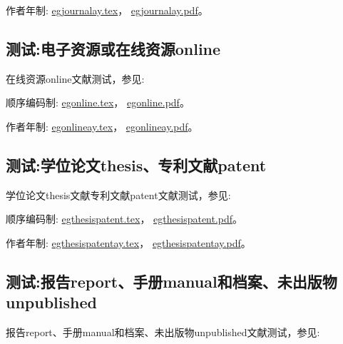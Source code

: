 作者年制:
\href{run:./example/egjournalay.tex}{egjournalay.tex}，
\href{run:./example/egjournalay.pdf}{egjournalay.pdf}。

\subsection{测试:电子资源或在线资源online}
在线资源online文献测试，参见:

顺序编码制:
\href{run:./example/egonline.tex}{egonline.tex}，
\href{run:./example/egonline.pdf}{egonline.pdf}。

作者年制:
\href{run:./example/egonlineay.tex}{egonlineay.tex}，
\href{run:./example/egonlineay.pdf}{egonlineay.pdf}。



\subsection{测试:学位论文thesis、专利文献patent}
学位论文thesis文献专利文献patent文献测试，参见:

顺序编码制:
\href{run:./example/egthesispatent.tex}{egthesispatent.tex}，
\href{run:./example/egthesispatent.pdf}{egthesispatent.pdf}。

作者年制:
\href{run:./example/egthesispatentay.tex}{egthesispatentay.tex}，
\href{run:./example/egthesispatentay.pdf}{egthesispatentay.pdf}。



\subsection{测试:报告report、手册manual和档案、未出版物unpublished}
报告report、手册manual和档案、未出版物unpublished文献测试，参见:

